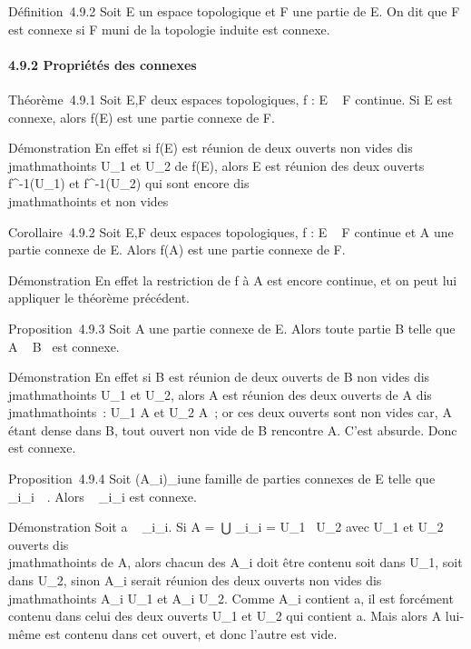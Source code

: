 \documentclass[]{article}
\begin{document}
Définition~4.9.2 Soit E un espace topologique et F une partie de E. On
dit que F est connexe si F muni de la topologie induite est connexe.

\paragraph{4.9.2 Propriétés des connexes}

Théorème~4.9.1 Soit E,F deux espaces topologiques, f : E \rightarrow~ F continue.
Si E est connexe, alors f(E) est une partie connexe de F.

Démonstration En effet si f(E) est réunion de deux ouverts non vides
dis\\jmathmathoints U_1 et U_2 de f(E), alors E est réunion des
deux ouverts f^-1(U_1) et
f^-1(U_2) qui sont encore dis\\jmathmathoints et non vides

Corollaire~4.9.2 Soit E,F deux espaces topologiques, f : E \rightarrow~ F continue
et A une partie connexe de E. Alors f(A) est une partie connexe de F.

Démonstration En effet la restriction de f à A est encore continue, et
on peut lui appliquer le théorème précédent.

Proposition~4.9.3 Soit A une partie connexe de E. Alors toute partie B
telle que A \subset~ B \subset~\overlineA est connexe.

Démonstration En effet si B est réunion de deux ouverts de B non vides
dis\\jmathmathoints U_1 et U_2, alors A est réunion des deux
ouverts de A dis\\jmathmathoints~: U_1 \bigcap A et U_2 \bigcap A~; or ces
deux ouverts sont non vides car, A étant dense dans B, tout ouvert non
vide de B rencontre A. C'est absurde. Donc \overlineA
est connexe.

Proposition~4.9.4 Soit (A_i)_i\inI une famille de
parties connexes de E telle que
\⋂ ~
_i\inIA_i\neq~\varnothing~. Alors
\⋃ ~
_i\inIA_i est connexe.

Démonstration Soit a
\in\⋂ ~
_i\inIA_i. Si A =\
⋃  _i\inIA_i = U_1~ \cup
U_2 avec U_1 et U_2 ouverts dis\\jmathmathoints de A,
alors chacun des A_i doit être contenu soit dans U_1,
soit dans U_2, sinon A_i serait réunion des deux
ouverts non vides dis\\jmathmathoints A_i \bigcap U_1 et A_i
\bigcap U_2. Comme A_i contient a, il est forcément contenu
dans celui des deux ouverts U_1 et U_2 qui contient a.
Mais alors A lui-même est contenu dans cet ouvert, et donc l'autre est
vide.
\end{document}
